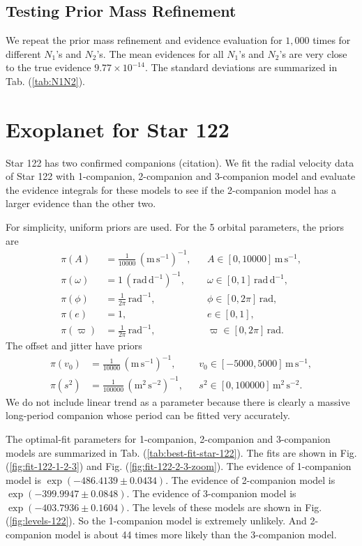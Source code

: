 \documentclass[letterpaper, preprint]{aastex}
\newcommand{\unit}[1]{\mathrm{#1}}
\begin{document}
\subsection{Testing Prior Mass Refinement}
We repeat the prior mass refinement and evidence evaluation for $1,000$ times for different $N_1$'s and $N_2$'s. The mean evidences for all $N_1$'s and $N_2$'s are very close to the true evidence  $9.77\times10^{-14}$. The standard deviations are summarized in Tab. (\ref{tab:N1N2}).

\section{Exoplanet for Star 122}
Star 122 has two confirmed companions (citation). We fit the radial velocity data of Star 122 with 1-companion, 2-companion and 3-companion model and evaluate the evidence integrals for these models to see if the 2-companion model has a larger evidence than the other two.

For simplicity, uniform priors are used. For the 5 orbital parameters, the priors are
\begin{align}
\pi(A) &= \frac{1}{10000}\,\unit{(m\,s^{-1})^{-1}},&&A\in[0,10000]\,\unit{m\,s^{-1}},\\
\pi(\omega) &= 1\,\unit{(rad\,d^{-1})^{-1}}, &&\omega\in[0,1]\,\unit{rad\,d^{-1}},\\
\pi(\phi) &= \frac{1}{2\pi}\,\unit{rad^{-1}},&&\phi\in[0,2\pi]\,\unit{rad},\\
\pi(e) &= 1,&&e\in[0,1],\\
\pi(\varpi) &= \frac{1}{2\pi}\,\unit{rad^{-1}},&&\varpi\in[0,2\pi]\,\unit{rad}.
\end{align}
The offset and jitter have priors
\begin{align}
\pi(v_0) &= \frac{1}{10000}\,\unit{(m\,s^{-1})^{-1}},&&v_0\in[-5000,5000]\,\unit{m\,s^{-1}},\\
\pi(s^2) &=\frac{1}{100000}\,\unit{(m^2\,s^{-2})^{-1}},&&s^2\in[0,100000]\,\unit{m^2\,s^{-2}}.
\end{align}
We do not include linear trend as a parameter because there is clearly a massive long-period companion whose period can be fitted very accurately.

The optimal-fit parameters for 1-companion, 2-companion and 3-companion models are summarized in Tab. (\ref{tab:best-fit-star-122}). The fits are shown in Fig. (\ref{fig:fit-122-1-2-3}) and Fig. (\ref{fig:fit-122-2-3-zoom}). The evidence of 1-companion model is $\exp{(-486.4139\pm0.0434)}$. The evidence of 2-companion model is $\exp{(-399.9947\pm0.0848)}$. The evidence of 3-companion model is $\exp{(-403.7936\pm0.1604)}$. The levels of these models are shown in Fig. (\ref{fig:levels-122}). So the 1-companion model is extremely unlikely. And 2-companion model is about 44 times more likely than the 3-companion model.
\end{document}
